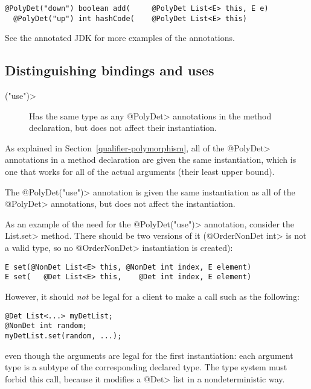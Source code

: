 \begin{Verbatim}
@PolyDet("down") boolean add(     @PolyDet List<E> this, E e)
  @PolyDet("up") int hashCode(    @PolyDet List<E> this)
\end{Verbatim}

See the annotated JDK for more examples of the annotations.


\subsection{Distinguishing bindings and uses\label{determinism-polymorphism-binding}}

\begin{description}
\item[\<("use")>]
  Has the same type as any \<@PolyDet> annotations in the method
  declaration, but does not affect their instantiation.
\end{description}

As explained in Section~\ref{qualifier-polymorphism},
all of the \<@PolyDet> annotations in a method declaration are given the same
instantiation, which is one that works for all of the actual arguments
(their least upper bound).

The \<@PolyDet("use")> annotation is given the same instantiation as all of the
\<@PolyDet> annotations, but does not affect the instantiation.

As an example of the need for the \<@PolyDet("use")> annotation, consider the
\<List.set> method.  There should be two versions of it (\<@OrderNonDet
int> is not a valid type, so no \<@OrderNonDet> instantiation is created):

\begin{Verbatim}
E set(@NonDet List<E> this, @NonDet int index, E element)
E set(   @Det List<E> this,    @Det int index, E element)
\end{Verbatim}

\noindent
However, it should \emph{not} be legal for a client to make a call such as
the following:

\begin{Verbatim}
@Det List<...> myDetList;
@NonDet int random;
myDetList.set(random, ...);
\end{Verbatim}

\noindent
even though the arguments are legal for the first instantiation:
each argument type is a subtype of the corresponding declared type.
The type system must forbid this call, because it modifies a
\<@Det> list in a nondeterministic way.

